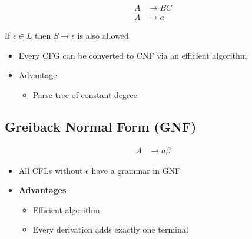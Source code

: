     \begin{align}
      A &\to BC \\
      A &\to a
    \end{align}

    If $ \epsilon \in L $ then $ S \to \epsilon $ is also allowed

    \begin{itemize}
      \item Every CFG can be converted to CNF via an efficient algorithm
      \item Advantage
      \begin{itemize}
        \item Parse tree of constant degree
      \end{itemize}
    \end{itemize}

  \subsection{Greiback Normal Form (GNF)}

    \begin{align}
      A &\to a \beta
    \end{align}

    \begin{itemize}
      \item All CFLs without $ \epsilon $ have a grammar in GNF
      \item \textbf{Advantages}
      \begin{itemize}
        \item Efficient algorithm
        \item Every derivation adds exactly one terminal
      \end{itemize}
    \end{itemize}
